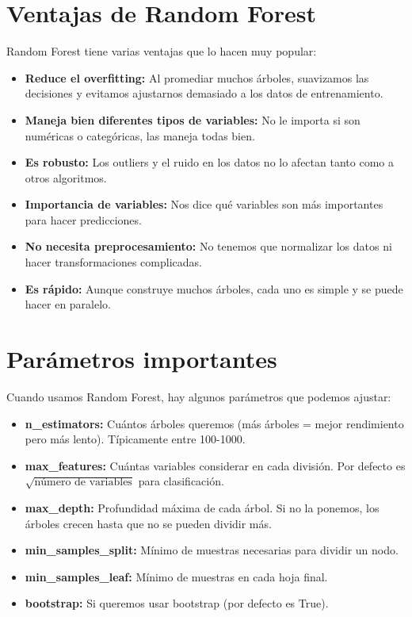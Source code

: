 \documentclass[12pt]{article}
\begin{document}
\section{Ventajas de Random Forest}
Random Forest tiene varias ventajas que lo hacen muy popular:

\begin{itemize}
    \item \textbf{Reduce el overfitting:} Al promediar muchos árboles, suavizamos las decisiones y evitamos ajustarnos demasiado a los datos de entrenamiento.
    \item \textbf{Maneja bien diferentes tipos de variables:} No le importa si son numéricas o categóricas, las maneja todas bien.
    \item \textbf{Es robusto:} Los outliers y el ruido en los datos no lo afectan tanto como a otros algoritmos.
    \item \textbf{Importancia de variables:} Nos dice qué variables son más importantes para hacer predicciones.
    \item \textbf{No necesita preprocesamiento:} No tenemos que normalizar los datos ni hacer transformaciones complicadas.
    \item \textbf{Es rápido:} Aunque construye muchos árboles, cada uno es simple y se puede hacer en paralelo.
\end{itemize}

\section{Parámetros importantes}
Cuando usamos Random Forest, hay algunos parámetros que podemos ajustar:

\begin{itemize}
    \item \textbf{n\_estimators:} Cuántos árboles queremos (más árboles = mejor rendimiento pero más lento). Típicamente entre 100-1000.
    \item \textbf{max\_features:} Cuántas variables considerar en cada división. Por defecto es $\sqrt{\text{número de variables}}$ para clasificación.
    \item \textbf{max\_depth:} Profundidad máxima de cada árbol. Si no la ponemos, los árboles crecen hasta que no se pueden dividir más.
    \item \textbf{min\_samples\_split:} Mínimo de muestras necesarias para dividir un nodo.
    \item \textbf{min\_samples\_leaf:} Mínimo de muestras en cada hoja final.
    \item \textbf{bootstrap:} Si queremos usar bootstrap (por defecto es True).
\end{itemize}
\end{document}
